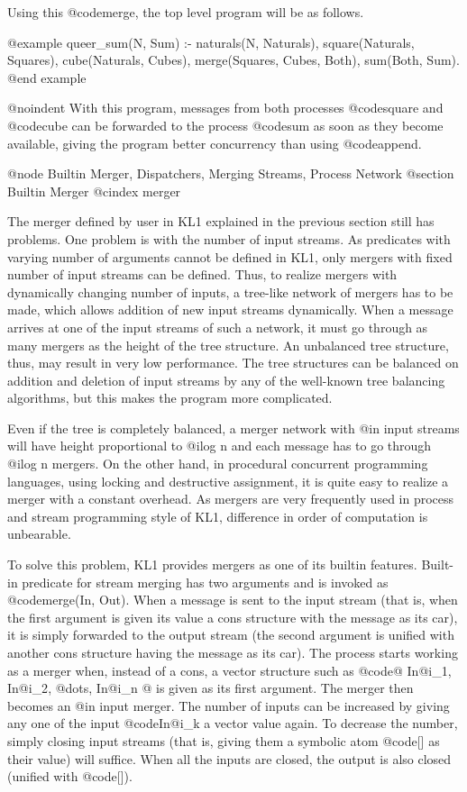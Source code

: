 {Using this @code{merge}, the top level program will be as follows.

@example
queer_sum(N, Sum) :-
    naturals(N, Naturals),
    square(Naturals, Squares),
    cube(Naturals, Cubes),
    merge(Squares, Cubes, Both),
    sum(Both, Sum).
@end example

@noindent
With this program, messages from both processes @code{square} and
@code{cube} can be forwarded to the process @code{sum} as soon as they
become available, giving the program better concurrency than using
@code{append}.

@node Builtin Merger, Dispatchers, Merging Streams, Process Network
@section Builtin Merger
@cindex merger

The merger defined by user in KL1 explained in the previous section
still has problems.  One problem is with the number of input streams.
As predicates with varying number of arguments cannot be defined in KL1,
only mergers with fixed number of input streams can be defined.  Thus,
to realize mergers with dynamically changing number of inputs, a
tree-like network of mergers has to be made, which allows addition of
new input streams dynamically.  When a message arrives at one of the
input streams of such a network, it must go through as many mergers as
the height of the tree structure.  An unbalanced tree structure, thus,
may result in very low performance.  The tree structures can be balanced
on addition and deletion of input streams by any of the well-known tree
balancing algorithms, but this makes the program more complicated.

Even if the tree is completely balanced, a merger network with @i{n}
input streams will have height proportional to @i{log n} and each
message has to go through @i{log n} mergers.  On the other hand, in
procedural concurrent programming languages, using locking and
destructive assignment, it is quite easy to realize a merger with a
constant overhead.  As mergers are very frequently used in process and
stream programming style of KL1, difference in order of computation is
unbearable.

To solve this problem, KL1 provides mergers as one of its builtin
features.  Built-in predicate for stream merging has two arguments and
is invoked as @code{merge(In, Out)}.  When a message is sent to the
input stream (that is, when the first argument is given its value a cons
structure with the message as its car), it is simply forwarded to the
output stream (the second argument is unified with another cons
structure having the message as its car).  The process starts working as
a merger when, instead of a cons, a vector structure such as @code{@{
In@i{_1}, In@i{_2}, @dots{}, In@i{_n} @}} is given as its first
argument.  The merger then becomes an @i{n} input merger.  The number of
inputs can be increased by giving any one of the input @code{In@i{_k}} a
vector value again.  To decrease the number, simply closing input
streams (that is, giving them a symbolic atom @code{[]} as their value)
will suffice.  When all the inputs are closed, the output is also closed
(unified with @code{[]}).

}
